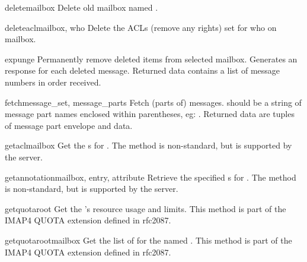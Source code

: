 \begin{methoddesc}[IMAP4]{delete}{mailbox}
  Delete old mailbox named .
\end{methoddesc}

\begin{methoddesc}[IMAP4]{deleteacl}{mailbox, who}
  Delete the ACLs (remove any rights) set for who on mailbox.
\end{methoddesc}

\begin{methoddesc}[IMAP4]{expunge}{}
  Permanently remove deleted items from selected mailbox. Generates an
   response for each deleted message. Returned data
  contains a list of  message numbers in order
  received.
\end{methoddesc}

\begin{methoddesc}[IMAP4]{fetch}{message_set, message_parts}
  Fetch (parts of) messages.   should be
  a string of message part names enclosed within parentheses,
  eg: .  Returned data are tuples
  of message part envelope and data.
\end{methoddesc}

\begin{methoddesc}[IMAP4]{getacl}{mailbox}
  Get the s for .
  The method is non-standard, but is supported by the  server.
\end{methoddesc}

\begin{methoddesc}[IMAP4]{getannotation}{mailbox, entry, attribute}
  Retrieve the specified s for .
  The method is non-standard, but is supported by the  server.
\end{methoddesc}

\begin{methoddesc}[IMAP4]{getquota}{root}
  Get the  's resource usage and limits.
  This method is part of the IMAP4 QUOTA extension defined in rfc2087.
\end{methoddesc}

\begin{methoddesc}[IMAP4]{getquotaroot}{mailbox}
  Get the list of   for the named .
  This method is part of the IMAP4 QUOTA extension defined in rfc2087.
\end{methoddesc}

